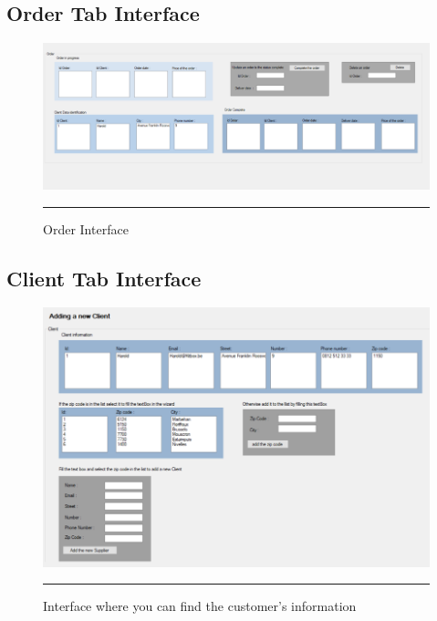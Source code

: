 	\newpage
	\subsection{Order Tab Interface}
    	\vfill
        \begin{figure}[h!]
            \centering
    		\includegraphics[width =1.2\textwidth,angle = 90]{Figures/OrderTab.png}
    		\rule{35em}{0.5pt}
    		\caption{Order Interface}
    		\label{ordermanagertab}
    	\end{figure}
    	\vfill
    	
	\newpage
	\subsection{Client Tab Interface}
    	\vfill
        \begin{figure}[h!]
            \centering
    		\includegraphics[width =1.2\textwidth,angle = 90]{Figures/ClientTab.png}
    		\rule{35em}{0.5pt}
    		\caption{Interface where you can find the customer's information}
    		\label{clientmanagertab}
    	\end{figure}
    	\vfill